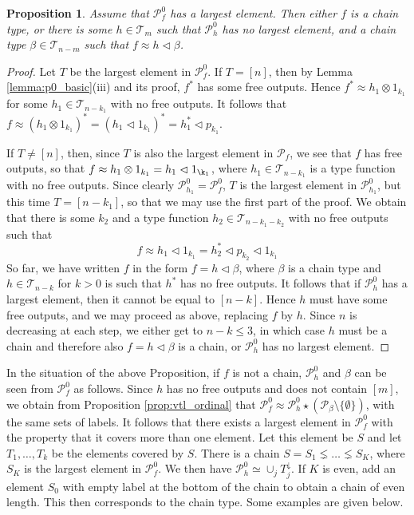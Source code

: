 \documentclass[12pt]{article}
\newtheorem{prop}{Proposition}
\theoremstyle{definition}
\theoremstyle{remark}
\def\Te{\mathcal T}
\def\Pe{\mathcal P}
\def\vtl{\vartriangleleft}
\begin{document}
\begin{prop}\label{prop:pf0_largest} Assume that $\Pe_f^0$ has a largest element.  Then
either $f$ is a chain type, or there is some $h\in \Te_m$ such that $\Pe_h^0$ has  no largest element,
and a chain type $\beta\in \Te_{n-m}$ such that $f\approx h\vtl \beta$.

\end{prop}



\begin{proof} Let $T$ be the largest element in $\Pe_f^0$. If $T=[n]$, then by Lemma
\ref{lemma:p0_basic}(iii) and its proof, $f^*$ has some free outputs. Hence
$f^*\approx h_1\otimes 1_{k_1}$ for some $h_1\in \Te_{n-k_1}$ with no free outputs. It follows that
$f\approx (h_1\otimes 1_{k_1})^*=(h_1\vtl 1_{k_1})^*=h_1^*\vtl p_{k_1}$. 

If $T\ne [n]$, then, since $T$  
is also the largest element in $\Pe_f$, we see that $f$ has free outputs, so that
$f\approx h_1\otimes 1_{k_1}=h_1\vtl 1_{\k_1}$, where $h_1\in \Te_{n-k_1}$ is a type function with no
free outputs. Since clearly $\Pe_{h_1}^0=\Pe_f^0$,  $T$ is the largest
element in $\Pe^0_{h_1}$, but this time $T=[n-k_1]$, so that we may use the first part of the
proof. We obtain that there is some $k_2$ and a type function  $h_2\in\Te_{n-k_1-k_2}$
with no free outputs such that 
\[
f\approx h_1\vtl 1_{k_1}=h_2^*\vtl p_{k_2}\vtl 1_{k_1}
\]
So far, we have written $f$ in the form $f=h\vtl \beta$, where $\beta$ is a chain type and
$h\in \Te_{n-k}$ for $k>0$ is such that $h^*$ has no free outputs. It follows that if
$\Pe_h^0$ has a largest element, then it cannot be equal to $[n-k]$. Hence $h$ must have
some free outputs, and we may proceed as above, replacing $f$ by $h$. Since $n$ is decreasing at each step, we
 either get to $n-k \le 3$, in which case $h$ must be a chain and therefore also $f=h\vtl
 \beta$ is a chain, or $\Pe^0_h$ has no largest element.


\end{proof}

In the situation of the above Proposition, if $f$ is not a chain, $\Pe_h^0$ and  $\beta$ can be
seen from $\Pe_f^0$ as follows. 
Since $h$ has no free outputs and does not contain
$[m]$, we obtain from Proposition \ref{prop:vtl_ordinal} that $\Pe_f^0\approx \Pe_h^0\star
(\Pe_\beta\setminus\{\emptyset\})$, with the same sets of labels.
It follows that there exists a largest element in $\Pe_f^0$ with the property that
it covers more than one element. Let this element be $S$ and let $T_1,\dots, T_k$ be the
elements covered by $S$. There is a chain $S=S_1\lneq \dots \lneq S_K$, where $S_K$ is
the largest element in $\Pe_f^0$. We then have $\Pe_h^0\simeq \cup_j T_j^{\downarrow}$. 
If $K$ is even, add an element $S_0$ with empty
label at the bottom of the chain to obtain a chain of even length. This then corresponds
to the chain type.  Some examples are given below.
\end{document}

